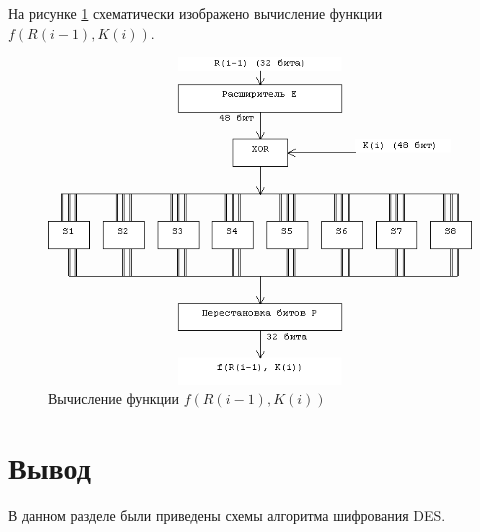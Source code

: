 На рисунке \ref{fig:des4} схематически изображено вычисление функции $f(R(i-1), K(i))$.

\begin{figure}[H]
	\centering
	\includegraphics[width=0.7\linewidth]{img/des_4}
	\caption{Вычисление функции $f(R(i-1), K(i))$}
	\label{fig:des4}
\end{figure}


\section*{Вывод}
В данном разделе были приведены схемы алгоритма шифрования DES.


